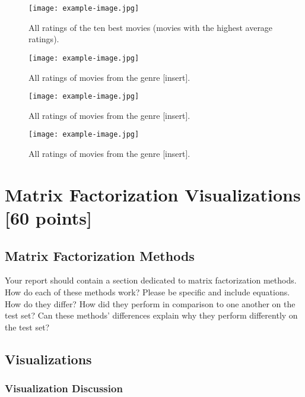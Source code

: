 \begin{figure}[!h]
    \centering
    \texttt{[image: example-image.jpg]}
    \caption{All ratings of the ten best movies (movies with the highest average ratings).}
    \label{fig:basic_vis_3}
\end{figure}

\begin{figure}[!h]
    \centering
    \texttt{[image: example-image.jpg]}
    \caption{All ratings of movies from the genre [insert].}
    \label{fig:basic_vis_4a}
\end{figure}

\begin{figure}[!h]
    \centering
    \texttt{[image: example-image.jpg]}
    \caption{All ratings of movies from the genre [insert].}
    \label{fig:basic_vis_4b}
\end{figure}

\begin{figure}[!h]
    \centering
    \texttt{[image: example-image.jpg]}
    \caption{All ratings of movies from the genre [insert].}
    \label{fig:basic_vis_4c}
\end{figure}

\newpage

\section{Matrix Factorization Visualizations [60 points]}

\subsection{Matrix Factorization Methods}

Your report should contain a section dedicated to matrix factorization methods. How do each of these methods work? Please be specific and include equations. How do they differ? How did they perform in comparison to one another on the test set? Can these methods’ differences explain why they perform differently on the test set?

\subsection{Visualizations}

\subsubsection{Visualization Discussion}

